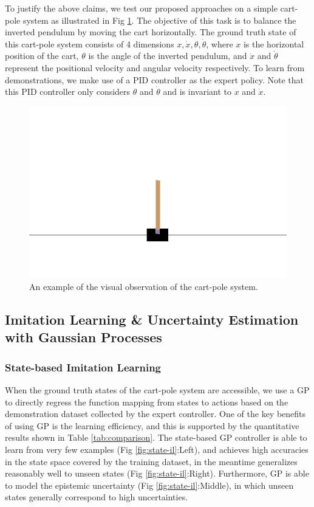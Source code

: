 \documentclass[11pt, reqno, letterpaper, twoside]{amsart}
\begin{document}
To justify the above claims, we test our proposed approaches on a simple cart-pole system as illustrated in Fig \ref{fig:cart-pole}. The objective of this task is to balance the inverted pendulum by moving the cart horizontally. The ground truth state of this cart-pole system consists of 4 dimensions $x, \Dot{x}, \theta, \Dot{\theta}$, where $x$ is the horizontal position of the cart, $\theta$ is the angle of the inverted pendulum, and $\Dot{x}$ and $\Dot{\theta}$ represent the positional velocity and angular velocity respectively. To learn from demonstrations, we make use of a PID controller as the expert policy. Note that this PID controller only considers $\theta$ and $\Dot{\theta}$ and is invariant to $x$ and $\Dot{x}$.

\begin{figure}[ht]
	\centering
	\includegraphics[width=0.5\linewidth]{imgs/random_rollout3.jpg}
	\caption{An example of the visual observation of the cart-pole system.}
	\label{fig:cart-pole}
\end{figure}

\subsection{Imitation Learning \& Uncertainty Estimation with Gaussian Processes}
\subsubsection{State-based Imitation Learning}
When the ground truth states of the cart-pole system are accessible, we use a GP to directly regress the function mapping from states to actions based on the demonstration dataset collected by the expert controller. One of the key benefits of using GP is the learning efficiency, and this is supported by the quantitative results shown in Table \ref{tab:comparison}. The state-based GP controller is able to learn from very few examples (Fig \ref{fig:state-il}:Left), and achieves high accuracies in the state space covered by the training dataset, in the meantime generalizes reasonably well to unseen states (Fig \ref{fig:state-il}:Right). Furthermore, GP is able to model the epistemic uncertainty (Fig \ref{fig:state-il}:Middle), in which unseen states generally correspond to high uncertainties.
\end{document}
